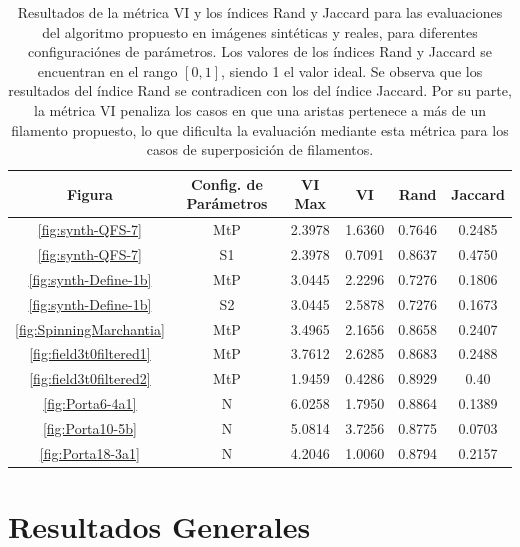 \begin{table}[h]
\centering
\begin{tabular}{|c|c|c|c|c|c|}
\hline
Figura & Config. de Par\'ametros & VI Max & VI & Rand & Jaccard \\ \hline
 \ref{fig:synth-QFS-7} & MtP  & 2.3978 & 1.6360 & 0.7646 & 0.2485 \\
 \ref{fig:synth-QFS-7} & S1  & 2.3978 & 0.7091 & 0.8637 & 0.4750  \\
 \ref{fig:synth-Define-1b} & MtP & 3.0445 & 2.2296 & 0.7276 & 0.1806 \\
 \ref{fig:synth-Define-1b} & S2 & 3.0445 & 2.5878 & 0.7276 & 0.1673  \\
 \ref{fig:SpinningMarchantia} & MtP & 3.4965 & 2.1656 & 0.8658 & 0.2407 \\
 \ref{fig:field3t0filtered1} & MtP & 3.7612 & 2.6285 & 0.8683 & 0.2488  \\
 \ref{fig:field3t0filtered2} & MtP & 1.9459 & 0.4286 & 0.8929 & 0.40 \\
 \ref{fig:Porta6-4a1} & N & 6.0258 & 1.7950 & 0.8864 & 0.1389 \\
 \ref{fig:Porta10-5b} & N & 5.0814 & 3.7256 & 0.8775 & 0.0703 \\
 \ref{fig:Porta18-3a1} & N & 4.2046 & 1.0060 & 0.8794 & 0.2157 \\ \hline
\end{tabular}
\caption[Resultados de la m\'etrica VI y los \'indices Rand y Jaccard para las evaluaciones del algoritmo propuesto.]{Resultados de la m\'etrica VI y los \'indices Rand y Jaccard para las evaluaciones del algoritmo propuesto en im\'agenes sint\'eticas y reales, para diferentes configuraci\'ones de par\'ametros. Los valores de los \'indices Rand y Jaccard se encuentran en el rango $[0,1]$, siendo 1 el valor ideal. Se observa que los resultados del \'indice Rand se contradicen con los del \'indice Jaccard. Por su parte, la m\'etrica VI penaliza los casos en que una aristas pertenece a m\'as de un filamento propuesto, lo que dificulta la evaluaci\'on mediante esta m\'etrica para los casos de superposici\'on de filamentos.}
\label{tab:VI-R-J-inconclu}
\end{table}


\section{Resultados Generales}

